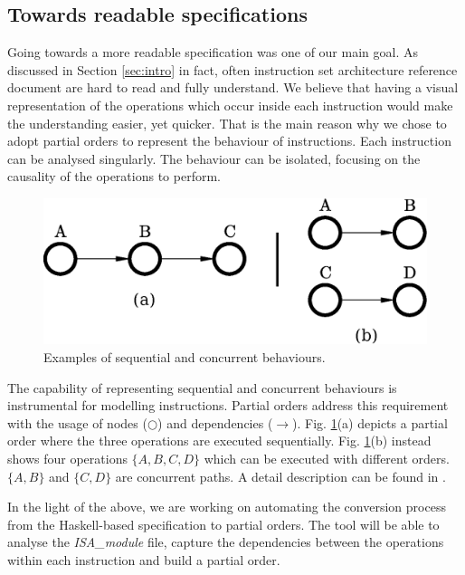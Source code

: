 \documentclass[conference]{IEEEtran}
\begin{document}
\subsection{Towards readable specifications}
Going towards a more readable specification was one of our main goal. As discussed in Section
\ref{sec:intro} in fact, often instruction set architecture reference document are hard to
read and fully understand. We believe that having a visual representation of the operations
which occur inside each instruction would make the understanding easier, yet quicker. That is
the main reason why we chose to adopt partial orders to represent the behaviour of
instructions. Each instruction can be analysed singularly. The behaviour can be isolated,
focusing on the causality of the operations to perform.

\begin{figure}[ht!]
\begin{center}
	\includegraphics[scale=0.5]{IMG/pos.eps}
	\caption{Examples of sequential and concurrent behaviours.}
	\label{fig:pos}
\end{center}
\end{figure}

The capability of representing sequential and concurrent behaviours is instrumental for
modelling instructions. Partial orders address this requirement with the usage of nodes
($\bigcirc$) and dependencies ($\rightarrow$). Fig. \ref{fig:pos}(a) depicts a partial order
where the three operations are executed sequentially. Fig. \ref{fig:pos}(b) instead shows
four operations $\lbrace A,B,C,D \rbrace$ which can be executed with different orders. 
$\lbrace A,B \rbrace$ and $\lbrace C,D \rbrace$ are concurrent paths. A detail
description can be found in \cite{andreyPhd}.

In the light of the above, we are working on automating the conversion process from the
Haskell-based specification to partial orders. The tool will be able to analyse the
\textit{ISA\_module} file, capture the dependencies between the operations within each
instruction and build a partial order. 
\end{document}
